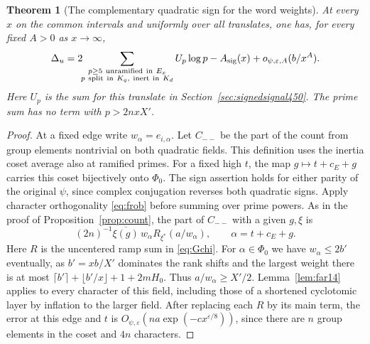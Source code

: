 \documentclass[a4paper,11pt]{article}
\newtheorem{theorem}[proposition]{Theorem}
\theoremstyle{definition}
\theoremstyle{remark}
\numberwithin{equation}{section}
\begin{document}
\begin{theorem}[The complementary quadratic sign for the word weights]\leavevmode
\label{thm:centerwords451}
At every \(x\) on the common intervals and uniformly over
all translates, one has, for every fixed \(A>0\) as \(x\to\infty\),
\[
 \Delta_u=
  2\!\!\sum_{\substack{p\ge5\ {\rm unramified\ in}\ E_x\\
             p\ {\rm split\ in}\ K_q,\ {\rm inert\ in}\ K_d}}
                     U_p\log p
       -A_{\rm sig}(x)+o_{\psi,\varepsilon,A}(b/x^A).
\]
Here \(U_p\) is the sum for this translate in
Section~\ref{sec:signedsignal450}. The prime sum has no term
with \(p>2nxX'\).
\end{theorem}
\begin{proof}
At a fixed edge write \(w_\alpha=e_{i,\alpha}\).
Let \(C_{--}\) be the part of the count from group elements
nontrivial on both quadratic fields. This definition uses the
inertia coset average also at ramified primes. For a fixed high
\(t\), the map \(g\mapsto t+c_E+g\) carries this coset bijectively
onto \(\Phi_0\). The sign assertion holds for either parity of the
original \(\psi\), since complex conjugation reverses both quadratic
signs. Apply character orthogonality \eqref{eq:frob} before summing
over prime powers. As in the proof of Proposition~\ref{prop:count},
the part of \(C_{--}\) with a given \(g,\xi\) is
\[
 (2n)^{-1}\overline{\xi(g)}\, w_\alpha
                       R_{\xi^*}(a/w_\alpha),
               \qquad \alpha=t+c_E+g.
\]
Here \(R\) is the uncentered ramp sum in \eqref{eq:Gchi}.
For \(\alpha\in\Phi_0\) we have \(w_\alpha\le2b'\) eventually,
as \(b'=xb/X'\) dominates the rank shifts and the largest
weight there is at most \(\lceil b'\rceil+\lfloor b'/x\rfloor
+1+2mH_0\). Thus \(a/w_\alpha\ge X'/2\). Lemma~\ref{lem:far14}
applies to every character of this field, including those
of a shortened cyclotomic layer by inflation to the larger field.
After replacing each \(R\) by its main term, the error at this
edge and \(t\) is \(O_{\psi,\varepsilon}(na\exp(-c x^{\varepsilon/8}))\),
since there are \(n\) group elements in the coset and \(4n\)
characters.


\end{proof}
\end{document}
